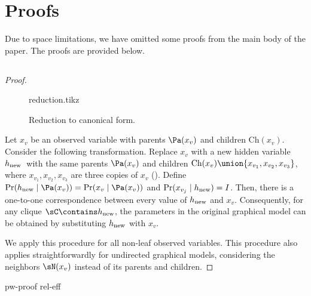 \section{Proofs}
\label{app:proofs}

Due to space limitations, we have omitted some proofs from
the main body of the paper.  The proofs are provided below.

\subsection{}
\label{app:reduction-proof}
\begin{proof}
  \begin{figure}
    \centering
    {reduction.tikz}
    \caption{Reduction to canonical form.}
    \label{fig:reduction}
  \end{figure}

  \providecommand{\hp}{\ensuremath{h_\text{\rm new}}}
  Let $x_v$ be an observed variable with parents $\Pa(x_v)$ and children $\text{Ch}(x_v)$.
  Consider the following transformation.
  Replace $x_v$ with a new hidden variable \hp\ with the same
  parents $\Pa(x_v)$ and children $\text{Ch}(x_v) \union \{x_{v_1}, x_{v_2}, x_{v_3}\}$,
  where $x_{v_1},x_{v_2},x_{v_3}$ are three copies of $x_v$
  ().
  Define $\Pr(\hp \mid \Pa(x_v)) = \Pr(x_v \mid \Pa(x_v))$ and
  $\Pr(x_{v_j} \mid \hp) = I$.
  Then, there is a one-to-one correspondence between every value of
  $\hp$ and $x_v$. Consequently, for any clique $\sC \contains \hp$, the
  parameters in the original graphical model can be obtained by
  substituting $\hp$ with $x_v$.

  We apply this procedure for all non-leaf observed variables.
  This procedure also applies straightforwardly for undirected graphical
  models, considering the neighbors $\sN(x_v)$ instead of its parents
  and children.
\end{proof}


{pw-proof}
{rel-eff}

